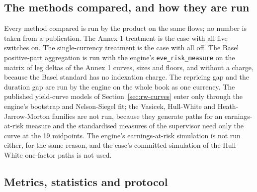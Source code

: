 \subsection{The methods compared, and how they are run}
\label{sec:design-methods}

Every method compared is run by the product on the same flows; no number is taken from a publication. The Annex 1 treatment is the case with all five switches on. The single-currency treatment is the case with all off. The Basel positive-part aggregation is run with the engine's \texttt{eve\_risk\_measure} on the matrix of leg deltas of the Annex 1 curves, sizes and floors, and without a charge, because the Basel standard has no indexation charge. The repricing gap and the duration gap are run by the engine on the whole book as one currency. The published yield-curve models of Section~\ref{sec:rw-curves} enter only through the engine's bootstrap and Nelson-Siegel fit; the Vasicek, Hull-White and Heath-Jarrow-Morton families are not run, because they generate paths for an earnings-at-risk measure and the standardised measures of the supervisor need only the curve at the 19 midpoints. The engine's earnings-at-risk simulation is not run either, for the same reason, and the case's committed simulation of the Hull-White one-factor paths is not used.

\subsection{Metrics, statistics and protocol}
\label{sec:design-protocol}

